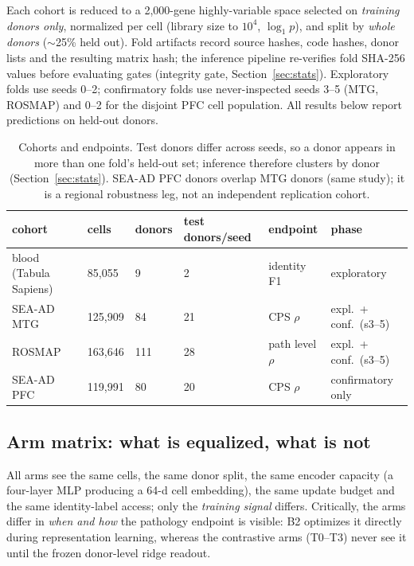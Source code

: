\documentclass[11pt]{article}
\begin{document}
Each cohort is reduced to a 2{,}000-gene highly-variable space selected
on \emph{training donors only}, normalized per cell (library size to
$10^4$, $\log_1p$), and split by \emph{whole donors} ($\sim$25\% held
out). Fold artifacts record source hashes, code hashes, donor lists and
the resulting matrix hash; the inference pipeline re-verifies fold
SHA-256 values before evaluating gates (integrity gate,
Section~\ref{sec:stats}). Exploratory folds use seeds 0--2;
confirmatory folds use never-inspected seeds 3--5 (MTG, ROSMAP) and
0--2 for the disjoint PFC cell population. All results below report
predictions on held-out donors.

\begin{table}[t]
\centering\small
\begin{tabular}{@{}llllll@{}}
\toprule
cohort & cells & donors & test donors/seed & endpoint & phase \\
\midrule
blood (Tabula Sapiens) & 85{,}055 & 9 & 2 & identity F1 & exploratory \\
SEA-AD MTG & 125{,}909 & 84 & 21 & CPS $\rho$ & expl.\ + conf.\ (s3--5) \\
ROSMAP & 163{,}646 & 111 & 28 & path level $\rho$ & expl.\ + conf.\ (s3--5) \\
SEA-AD PFC & 119{,}991 & 80 & 20 & CPS $\rho$ & confirmatory only \\
\bottomrule
\end{tabular}
\caption{Cohorts and endpoints. Test donors differ across seeds, so a
donor appears in more than one fold's held-out set; inference therefore
clusters by donor (Section~\ref{sec:stats}). SEA-AD PFC donors overlap
MTG donors (same study); it is a regional robustness leg, not an
independent replication cohort.}
\label{tab:data}
\end{table}

\subsection{Arm matrix: what is equalized, what is not}
\label{sec:arms}

All arms see the same cells, the same donor split, the same encoder
capacity (a four-layer MLP producing a 64-d cell embedding), the same
update budget and the same
identity-label access; only the \emph{training signal} differs.
Critically, the arms differ in \emph{when and how} the pathology endpoint
is visible: B2 optimizes it directly during representation learning,
whereas the contrastive arms (T0--T3) never see it until the frozen
donor-level ridge readout.
\end{document}
